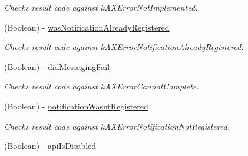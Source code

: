 \begin{DoxyCompactItemize}
\begin{DoxyCompactList}\small\item\em Checks result code against kAXErrorNotImplemented. \item\end{DoxyCompactList}\item 
\hypertarget{interface_g_d_accessibility_operation_result_a3bf7cb2d69039587ff4f03adcf8747c1}{
(Boolean) -\/ \hyperlink{interface_g_d_accessibility_operation_result_a3bf7cb2d69039587ff4f03adcf8747c1}{wasNotificationAlreadyRegistered}}
\label{interface_g_d_accessibility_operation_result_a3bf7cb2d69039587ff4f03adcf8747c1}

\begin{DoxyCompactList}\small\item\em Checks result code against kAXErrorNotificationAlreadyRegistered. \item\end{DoxyCompactList}\item 
\hypertarget{interface_g_d_accessibility_operation_result_ab1140deb8ccfae9cfa3ba3888e2131c8}{
(Boolean) -\/ \hyperlink{interface_g_d_accessibility_operation_result_ab1140deb8ccfae9cfa3ba3888e2131c8}{didMessagingFail}}
\label{interface_g_d_accessibility_operation_result_ab1140deb8ccfae9cfa3ba3888e2131c8}

\begin{DoxyCompactList}\small\item\em Checks result code against kAXErrorCannotComplete. \item\end{DoxyCompactList}\item 
\hypertarget{interface_g_d_accessibility_operation_result_a267a7576d7bd91ea8644c7199df15aa6}{
(Boolean) -\/ \hyperlink{interface_g_d_accessibility_operation_result_a267a7576d7bd91ea8644c7199df15aa6}{notificationWasntRegistered}}
\label{interface_g_d_accessibility_operation_result_a267a7576d7bd91ea8644c7199df15aa6}

\begin{DoxyCompactList}\small\item\em Checks result code against kAXErrorNotificationNotRegistered. \item\end{DoxyCompactList}\item 
\hypertarget{interface_g_d_accessibility_operation_result_af4a4732d3c44ef1e912bea8367bca9c9}{
(Boolean) -\/ \hyperlink{interface_g_d_accessibility_operation_result_af4a4732d3c44ef1e912bea8367bca9c9}{apiIsDisabled}}
\label{interface_g_d_accessibility_operation_result_af4a4732d3c44ef1e912bea8367bca9c9}


\end{DoxyCompactItemize}
